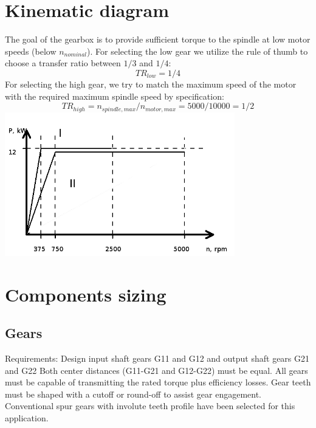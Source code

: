 \documentclass{article}
\begin{document}
\section{Kinematic diagram} %
The goal of the gearbox is to provide sufficient torque to the spindle at low motor speeds (below $n_{nominal}$).
For selecting the low gear we utilize the rule of thumb to choose a transfer ratio between $1/3$ and $1/4$:
$$ TR_{low} = 1/4 $$
For selecting the high gear, we try to match the maximum speed of the motor with the required maximum spindle speed by specification:
$$ TR_{high} = n_{spindle, max} / n_{motor, max} = 5000 / 10000 = 1/2$$
\includegraphics[width=0.75\textwidth]{images/kinematics}~

\section{Components sizing}
\subsection{Gears}
Requirements: Design input shaft gears G11 and G12 and output shaft gears G21 and G22
Both center distances (G11-G21 and G12-G22) must be equal.
All gears must be capable of transmitting the rated torque  plus efficiency losses.
Gear teeth must be shaped with a cutoff or round-off to assist gear engagement.  %
Conventional spur gears with involute teeth profile have been selected for this application.
\end{document}
